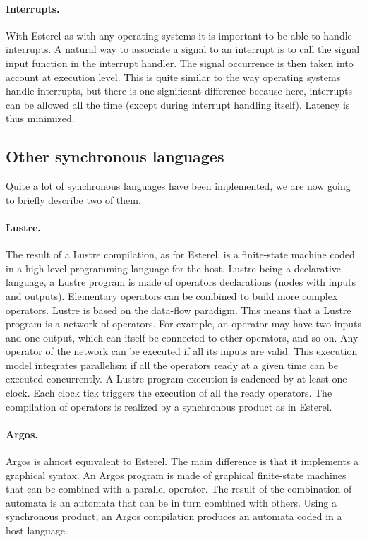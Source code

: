 \documentclass[10pt]{report}
\begin{document}
\paragraph{Interrupts.}  With Esterel as with any operating systems it is important to be able to handle interrupts. A natural way to associate 
a signal to an interrupt is to call the signal input function in the interrupt handler. The signal occurrence is then
taken into account at execution level. This is quite similar to the way operating systems handle interrupts, but there is one
significant difference because here, interrupts can be allowed all the time (except during interrupt handling itself). Latency
is thus minimized.

\subsection{Other synchronous languages}

Quite a lot of synchronous languages have been implemented, we are now going to briefly describe two of them.

\paragraph{Lustre.} The result of a Lustre compilation, as for Esterel, is a finite-state machine coded in a high-level programming language 
for the host. Lustre being a declarative language, a Lustre program is made of operators declarations (nodes with inputs
and outputs). Elementary operators can be combined to build more complex operators. Lustre is based on the data-flow paradigm. This means
that a Lustre program is a network of operators. For example, an operator may have two inputs and one output, which can itself be connected
to other operators, and so on. Any operator of the network can be executed if all its inputs are valid. This execution model
integrates parallelism if all the operators ready at a given time can be executed concurrently. A Lustre program execution is cadenced by 
at least one clock. Each clock tick triggers the execution of all the ready operators. The compilation of operators is realized by a synchronous
product as in Esterel.

\paragraph{Argos.} Argos is almost equivalent to Esterel. The main difference is that it implements a graphical syntax. An
Argos program is made of graphical finite-state machines that can be combined with a parallel operator. The result of the combination 
of automata is an automata that can be in turn combined with others. Using a synchronous product, an Argos compilation produces an automata coded 
in a host language.
\end{document}
